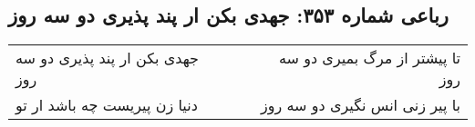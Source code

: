 \begin{center}
\section*{رباعی شماره ۳۵۳: جهدی بکن ار پند پذیری دو سه روز}
\label{sec:sh353}
\begin{longtable}{l p{0.5cm} r}
جهدی بکن ار پند پذیری دو سه روز
&&
تا پیشتر از مرگ بمیری دو سه روز
\\
دنیا زن پیریست چه باشد ار تو
&&
با پیر زنی انس نگیری دو سه روز
\\
\end{longtable}
\end{center}
